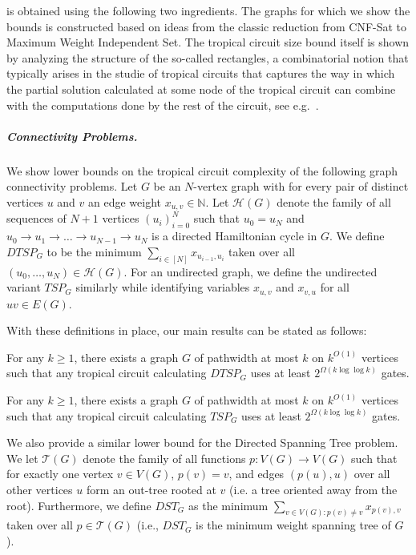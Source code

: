  is obtained using the following two ingredients. The graphs for which we show the bounds is constructed based on ideas from the classic reduction from CNF-Sat to Maximum Weight Independent Set. The tropical circuit size bound itself is shown by analyzing the structure of the so-called rectangles, a combinatorial notion that typically arises in the studie of tropical circuits that captures the way in which the partial solution calculated at some node of the tropical circuit can combine with the computations done by the rest of the circuit, see e.g.~\cite{Jukna2023}.

\subparagraph{Connectivity Problems.}
We show lower bounds on the tropical circuit complexity of the following graph connectivity problems. Let $G$ be an $N$-vertex graph with for every pair of distinct vertices $u$ and $v$ an edge weight $x_{u,v}\in \mathbb{N}$. Let $\mathcal{H}(G)$ denote the family of all sequences of $N + 1$ vertices $(u_i)_{i =0}^N$ such that $u_0 = u_N$ and $u_0 \to u_1 \to \dots \to u_{N - 1} \to u_N$ is a directed Hamiltonian cycle in $G$.
We define $DTSP_G$ to be the minimum $\sum_{i\in [N]}x_{u_{i-1},u_i}$ taken over all $(u_0,\ldots,u_N) \in \mathcal{H}(G)$. For an undirected graph, we define the undirected variant $TSP_G$ similarly while identifying variables $x_{u,v}$ and $x_{v, u}$ for all $uv \in E(G)$.

With these definitions in place, our main results can be stated as follows:
\begin{theorem}\label{thm:main_dtsp}
    For any $k \geq 1$, there exists a graph $G$ of pathwidth at most $k$ on $k^{O(1)}$ vertices such that any tropical circuit calculating $DTSP_G$ uses at least $2^{\Omega(k \log \log k)}$ gates.
\end{theorem}

\begin{theorem}\label{thm:main_tsp}
    For any $k \geq 1$, there exists a graph $G$ of pathwidth at most $k$ on $k^{O(1)}$ vertices such that any tropical circuit calculating $TSP_{G}$ uses at least $2^{\Omega(k \log \log k)}$ gates.
\end{theorem}
We also provide a similar lower bound for the Directed Spanning Tree problem.
We let $\mathcal{T}(G)$ denote the family of all functions $p : V(G) \to V(G)$ such that for exactly one vertex $v \in V(G)$, $p(v) = v$, and edges $(p(u), u)$ over all other vertices $u$ form an out-tree rooted at $v$ (i.e. a tree oriented away from the root). Furthermore, we define $DST_G$ as the minimum $\sum_{v \in V(G) : p(v) \neq v} x_{p(v), v}$ taken over all $p \in \mathcal{T}(G)$ (i.e., $DST_G$ is the minimum weight spanning tree of $G$).

